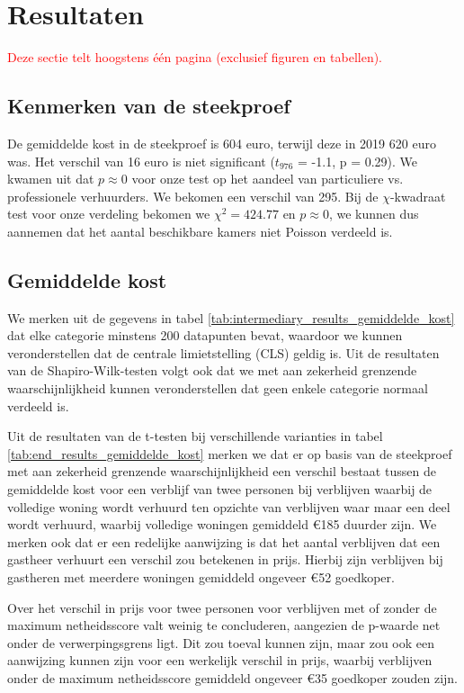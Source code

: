 \documentclass[a4paper]{kulakarticle}
\newcommand{\rood}[1]{\textcolor{red}{#1}}
\begin{document}
	
	\section{Resultaten}
	\rood{Deze sectie telt hoogstens één pagina (exclusief figuren en tabellen).}
	\subsection{Kenmerken van de steekproef}
De gemiddelde kost in de steekproef is 604 euro, terwijl deze in 2019 620 euro was. Het verschil van 16 euro is niet significant ($t_{976}$ = -1.1, p = 0.29). We kwamen uit dat $p \approx 0$ voor onze test op het aandeel van particuliere vs. professionele verhuurders. We bekomen een verschil van 295. Bij de $\chi$-kwadraat test voor onze verdeling bekomen we $\chi^2 = 424.77$ en $p \approx 0$, we kunnen dus aannemen dat het aantal beschikbare kamers niet Poisson verdeeld is.
	
	\subsection{Gemiddelde kost}
	
	We merken uit de gegevens in tabel \ref{tab:intermediary_results_gemiddelde_kost} dat elke categorie minstens 200 datapunten bevat, waardoor we kunnen veronderstellen dat de centrale limietstelling (CLS) geldig is. Uit de resultaten van de Shapiro-Wilk-testen volgt ook dat we met aan zekerheid grenzende waarschijnlijkheid kunnen veronderstellen dat geen enkele categorie normaal verdeeld is.
	
	Uit de resultaten van de t-testen bij verschillende varianties in tabel \ref{tab:end_results_gemiddelde_kost} merken we dat er op basis van de steekproef met aan zekerheid grenzende waarschijnlijkheid een verschil bestaat tussen de gemiddelde kost voor een verblijf van twee personen bij verblijven waarbij de volledige woning wordt verhuurd ten opzichte van verblijven waar maar een deel wordt verhuurd, waarbij volledige woningen gemiddeld €185 duurder zijn. We merken ook dat er een redelijke aanwijzing is dat het aantal verblijven dat een gastheer verhuurt een verschil zou betekenen in prijs. Hierbij zijn verblijven bij gastheren met meerdere woningen gemiddeld ongeveer €52 goedkoper.
	
	Over het verschil in prijs voor twee personen voor verblijven met of zonder de maximum netheidsscore valt weinig te concluderen, aangezien de p-waarde net onder de verwerpingsgrens ligt. Dit zou toeval kunnen zijn, maar zou ook een aanwijzing kunnen zijn voor een werkelijk verschil in prijs, waarbij verblijven onder de maximum netheidsscore gemiddeld ongeveer €35 goedkoper zouden zijn.
	
\end{document}
